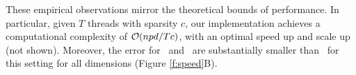 \documentclass[10pt]{article}
\begin{document}
 These empirical observations mirror the theoretical bounds of performance.  In particular, given $T$ threads with sparsity $c$, our implementation achieves a computational complexity of $\mathcal{O}(npd/Tc)$, with an optimal speed up and scale up (not shown).
 Moreover, the error for \Lol~and \Lal~are substantially smaller than \Pca~for this setting for all dimensions (Figure \ref{f:speed}{\color{magenta}B}). 
 

%
%
\end{document}
